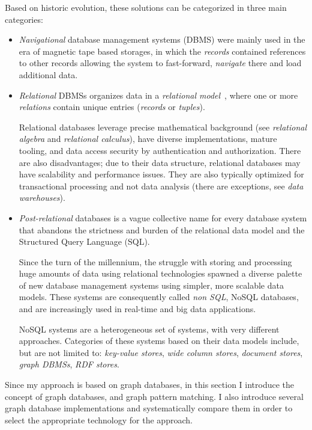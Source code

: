 Based on historic evolution, these solutions can be categorized in three main categories:
\begin{itemize}[topsep=0pt]
  \item \emph{Navigational} database management systems (DBMS) were mainly used in the era of magnetic tape based storages, in which the \emph{records} contained references to other records allowing the system to fast-forward, \emph{navigate} there and load additional data.

  \item \emph{Relational} DBMSs organizes data in a \emph{relational model}~\cite{codd}, where one or more \emph{relations} contain unique entries (\emph{records} or \emph{tuples}).

  Relational databases leverage precise mathematical background (see \emph{relational algebra} and \emph{relational calculus}), have diverse implementations, mature tooling, and data access security by authentication and authorization. There are also disadvantages; due to their data structure, relational databases may have scalability and performance issues. They are also typically optimized for transactional processing and not data analysis (there are exceptions, see \emph{data warehouses}).

  \item \emph{Post-relational} databases is a vague collective name for every database system that abandons the strictness and burden of the relational data model and the Structured Query Language (SQL).

  Since the turn of the millennium, the struggle with storing and processing huge amounts of data using relational technologies spawned a diverse palette of new database management systems using simpler, more scalable data models. These systems are consequently called \emph{non SQL}, NoSQL databases, and are increasingly used in real-time and big data applications.

  NoSQL systems are a heterogeneous set of systems, with very different approaches. Categories of these systems based on their data models include, but are not limited to: \emph{key-value stores}, \emph{wide column stores}, \emph{document stores}, \emph{graph DBMSs}, \emph{RDF stores}.
\end{itemize}

Since my approach is based on graph databases, in this section I introduce the concept of graph databases, and graph pattern matching. I also introduce several graph database implementations and systematically compare them in order to select the appropriate technology for the approach.


